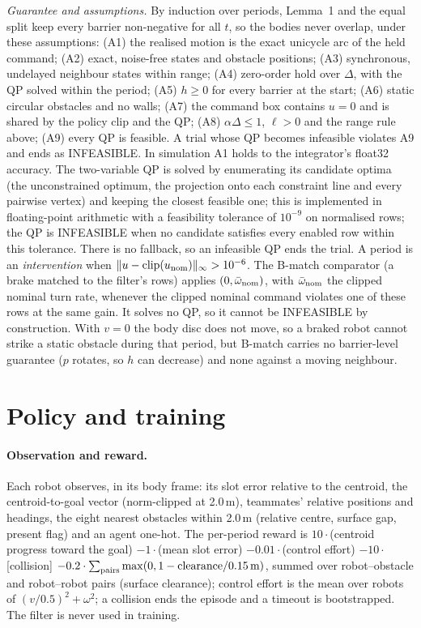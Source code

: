 \documentclass[journal]{IEEEtran}
\begin{document}
\emph{Guarantee and assumptions.} By induction over periods, Lemma~1 and the equal split keep every
barrier non-negative for all $t$, so the bodies never overlap, under these assumptions: (A1) the
realised motion is the exact unicycle arc of the held command; (A2) exact, noise-free states and obstacle
positions; (A3) synchronous, undelayed neighbour states within range; (A4) zero-order hold over $\Delta$,
with the QP solved within the period; (A5) $h\ge0$ for every barrier at the start; (A6) static circular
obstacles and no walls; (A7) the command box contains $u=0$ and is shared by the policy clip and the
QP; (A8) $\alpha\Delta\le1$, $\ell>0$ and the range rule above; (A9) every QP is feasible. A trial whose
QP becomes infeasible violates A9 and ends as INFEASIBLE. In simulation A1 holds to the integrator's
float32 accuracy. The two-variable QP is solved by enumerating its candidate optima (the unconstrained optimum, the
projection onto each constraint line and every pairwise vertex) and keeping the closest feasible one;
this is implemented in floating-point arithmetic with a feasibility tolerance of $10^{-9}$ on
normalised rows; the QP is INFEASIBLE when no candidate satisfies every enabled row within this
tolerance. There is no fallback, so an infeasible QP ends the trial. A period is an \emph{intervention}
when $\|u-\mathrm{clip}(u_{\rm nom})\|_\infty>10^{-6}$.
The B-match comparator (a brake matched to the filter's rows) applies $(0,\bar\omega_{\rm nom})$, with
$\bar\omega_{\rm nom}$ the clipped nominal turn rate, whenever the clipped nominal command violates one
of these rows at the same gain. It solves no QP, so it cannot be INFEASIBLE by construction. With $v=0$
the body disc does not move, so a braked robot cannot strike a static obstacle during that period, but
B-match carries no barrier-level guarantee ($p$ rotates, so $h$ can decrease) and none against a moving
neighbour.

\section{Policy and training}\label{sec:policy}
\paragraph{Observation and reward.} Each robot observes, in its body frame: its slot error relative
to the centroid, the centroid-to-goal vector (norm-clipped at 2.0\,m), teammates' relative positions
and headings, the eight nearest obstacles within 2.0\,m (relative centre, surface gap, present flag)
and an agent one-hot. The per-period reward is
$10\cdot$(centroid progress toward the goal) $-1\cdot$(mean slot error) $-0.01\cdot$(control effort)
$-10\cdot$[collision] $-0.2\cdot\sum_{\rm pairs}\max(0,1-\text{clearance}/0.15\,\mathrm{m})$, summed over robot--obstacle and robot--robot pairs (surface clearance); control effort is the mean over robots of $(v/0.5)^2+\omega^2$; a collision
ends the episode and a timeout is bootstrapped. The filter is never used in training.
\end{document}
